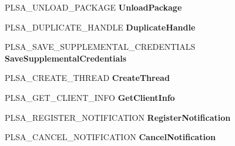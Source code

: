 \begin{DoxyCompactItemize}
\item 
\mbox{\label{struct___l_s_a___s_e_c_p_k_g___f_u_n_c_t_i_o_n___t_a_b_l_e_a8ad186292d78a6771aab777a2ec0a1a1}} 
P\+L\+S\+A\+\_\+\+U\+N\+L\+O\+A\+D\+\_\+\+P\+A\+C\+K\+A\+GE {\bfseries Unload\+Package}
\item 
\mbox{\label{struct___l_s_a___s_e_c_p_k_g___f_u_n_c_t_i_o_n___t_a_b_l_e_a2e4dae1e1bca319590d5a2ef72383a74}} 
P\+L\+S\+A\+\_\+\+D\+U\+P\+L\+I\+C\+A\+T\+E\+\_\+\+H\+A\+N\+D\+LE {\bfseries Duplicate\+Handle}
\item 
\mbox{\label{struct___l_s_a___s_e_c_p_k_g___f_u_n_c_t_i_o_n___t_a_b_l_e_a4f99b23b3eebe62af89c7ee7f955141b}} 
P\+L\+S\+A\+\_\+\+S\+A\+V\+E\+\_\+\+S\+U\+P\+P\+L\+E\+M\+E\+N\+T\+A\+L\+\_\+\+C\+R\+E\+D\+E\+N\+T\+I\+A\+LS {\bfseries Save\+Supplemental\+Credentials}
\item 
\mbox{\label{struct___l_s_a___s_e_c_p_k_g___f_u_n_c_t_i_o_n___t_a_b_l_e_a64ac9641097d283df252e915c8606605}} 
P\+L\+S\+A\+\_\+\+C\+R\+E\+A\+T\+E\+\_\+\+T\+H\+R\+E\+AD {\bfseries Create\+Thread}
\item 
\mbox{\label{struct___l_s_a___s_e_c_p_k_g___f_u_n_c_t_i_o_n___t_a_b_l_e_af0a208700aaf2a830671bf045a8ccbc7}} 
P\+L\+S\+A\+\_\+\+G\+E\+T\+\_\+\+C\+L\+I\+E\+N\+T\+\_\+\+I\+N\+FO {\bfseries Get\+Client\+Info}
\item 
\mbox{\label{struct___l_s_a___s_e_c_p_k_g___f_u_n_c_t_i_o_n___t_a_b_l_e_a8676df13722adedd5eb996752ddb2e3e}} 
P\+L\+S\+A\+\_\+\+R\+E\+G\+I\+S\+T\+E\+R\+\_\+\+N\+O\+T\+I\+F\+I\+C\+A\+T\+I\+ON {\bfseries Register\+Notification}
\item 
\mbox{\label{struct___l_s_a___s_e_c_p_k_g___f_u_n_c_t_i_o_n___t_a_b_l_e_a5d19cd93665afe0d77eb31e9e478532e}} 
P\+L\+S\+A\+\_\+\+C\+A\+N\+C\+E\+L\+\_\+\+N\+O\+T\+I\+F\+I\+C\+A\+T\+I\+ON {\bfseries Cancel\+Notification}
\item 

\end{DoxyCompactItemize}
